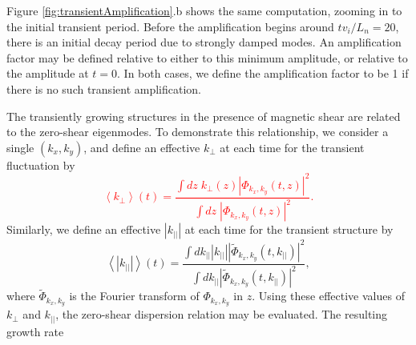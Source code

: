 \documentclass[12pt,superscriptaddress]{revtex4}
\newcommand{\changed}[1]{\textcolor{red}{#1}}
\begin{document}
Figure \ref{fig:transientAmplification}.b shows the same computation, zooming in to the initial transient period.
Before the amplification begins around $t v_i/L_n=20$, there is an initial decay period due to strongly
damped modes. An amplification factor may be defined relative to either to this minimum amplitude,
or relative to the amplitude at $t=0$.
In both cases, we define the amplification factor to be 1
if there is no such transient amplification.

The transiently growing structures in the presence of magnetic shear
are related to the zero-shear eigenmodes.  To demonstrate this relationship, we consider a single
$(k_x,k_y)$, and define an effective
$k_{\perp}$ at each time for the transient fluctuation by
\changed{
\begin{equation}
\label{eq:expectedKperp}
\left< k_{\perp} \right>(t) = 
\frac{\int dz\; k_{\perp}(z) \left| \Phi_{k_x,k_y}(t,z)\right|^2}
{\int dz\; \left| \Phi_{k_x,k_y}(t,z)\right|^2}.
\end{equation}
}
Similarly, we define an effective $|k_{||}|$ at each time for the transient structure
by
\begin{equation}
\label{eq:expectedKpar}
\left< \left| k_{||} \right| \right>(t) = \frac{\int dk_{||}  \left| k_{||}\right| \left| \tilde\Phi_{k_x,k_y}(t,k_{||})\right|^2}
{\int dk_{||}\left| \tilde\Phi_{k_x,k_y}(t,k_{||})\right|^2},
\end{equation}
where $\tilde\Phi_{k_x,k_y}$ is the Fourier transform of $\Phi_{k_x,k_y}$ in $z$. Using these effective values
of $k_{\perp}$ and $k_{||}$, the zero-shear dispersion relation may be evaluated.
The resulting growth rate 
\end{document}
